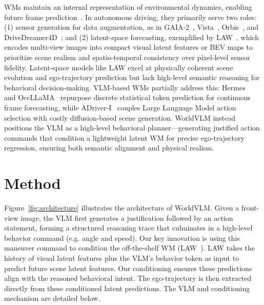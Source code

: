 \documentclass[letterpaper, 10 pt, conference]{ieeeconf}
\begin{document}
WMs maintain an internal representation of environmental dynamics, enabling future frame prediction~\cite{ha2018world}. In autonomous driving, they primarily serve two roles: (1) sensor generation for data augmentation, as in GAIA-2~\cite{russell2025gaia2}, Vista~\cite{gao2024vista}, Orbis~\cite{orbis2025}, and DriveDreamer4D~\cite{zhao_2025_drivedreamer4d}; and (2) latent-space forecasting, exemplified by LAW~\cite{li2025enhancing}, which encodes multi-view images into compact visual latent features or BEV maps to prioritize scene realism and spatio-temporal consistency over pixel-level sensor fidelity.
Latent-space models like LAW excel at physically coherent scene evolution and ego-trajectory prediction but lack high-level semantic reasoning for behavioral decision-making. VLM-based WMs partially address this: Hermes~\cite{zhou2025hermes} and OccLLaMA~\cite{wei2024occllama} repurpose discrete statistical token prediction for continuous frame forecasting, while ADriver-I~\cite{ADriverI2023} couples Large Language Model action selection with costly diffusion-based scene generation.
WorldVLM instead positions the VLM as a high-level behavioral planner—generating justified action commands that condition a lightweight latent WM for precise ego-trajectory regression, ensuring both semantic alignment and physical realism.
 

\section{Method}
Figure~\ref{fig:architecture} illustrates the architecture of WorldVLM. Given a front-view image, the VLM first generates a justification followed by an action statement, forming a structured reasoning trace that culminates in a high-level behavior command (e.g. angle and speed). Our key innovation is using this maneuver command to condition the off-the-shelf WM (LAW~\cite{li2025enhancing}). LAW takes the history of visual latent features plus the VLM's behavior token as input to predict future scene latent features. Our conditioning ensures these predictions align with the reasoned behavioral intent. The ego-trajectory is then extracted directly from these conditioned latent predictions. The VLM and conditioning mechanism are detailed below.
\end{document}

